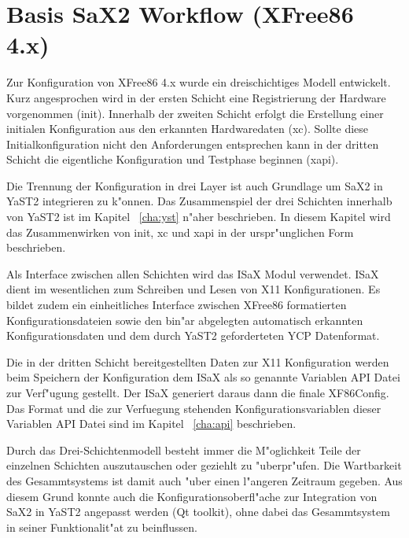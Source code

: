 \chapter{Basis SaX2 Workflow (XFree86 4.x)}
\label{cha:dsp}
\minitoc
Zur Konfiguration von XFree86 4.x wurde ein dreischichtiges Modell
entwickelt. Kurz angesprochen wird in der ersten Schicht eine
Registrierung der Hardware vorgenommen (init). Innerhalb der 
zweiten Schicht erfolgt die Erstellung einer initialen Konfiguration
aus den erkannten Hardwaredaten (xc). Sollte diese Initialkonfiguration
nicht den Anforderungen entsprechen kann in der dritten Schicht
die eigentliche Konfiguration und Testphase beginnen (xapi).

Die Trennung der Konfiguration in drei Layer ist auch Grundlage
um SaX2 in YaST2 integrieren zu k"onnen. Das Zusammenspiel
der drei Schichten innerhalb von YaST2 ist im Kapitel ~\ref{cha:yst}
n"aher beschrieben. In diesem Kapitel wird das Zusammenwirken von
init, xc und xapi in der urspr"unglichen Form beschrieben.

Als Interface zwischen allen Schichten wird das ISaX Modul
verwendet. ISaX dient im wesentlichen zum Schreiben und Lesen
von X11 Konfigurationen. Es bildet zudem ein einheitliches Interface
zwischen XFree86 formatierten Konfigurationsdateien sowie den bin"ar
abgelegten automatisch erkannten Konfigurationsdaten und dem
durch YaST2 geforderteten YCP Datenformat.

Die in der dritten Schicht bereitgestellten Daten zur X11 Konfiguration
werden beim Speichern der Konfiguration dem ISaX als so genannte 
Variablen API Datei zur Verf"ugung gestellt. Der ISaX generiert daraus
dann die finale XF86Config. Das Format und die zur Verfuegung stehenden
Konfigurationsvariablen dieser Variablen API Datei sind im Kapitel 
~\ref{cha:api} beschrieben.

Durch das Drei-Schichtenmodell besteht immer die M"oglichkeit Teile 
der einzelnen Schichten auszutauschen oder geziehlt zu "uberpr"ufen.
Die Wartbarkeit des Gesammtsystems ist damit auch "uber einen l"angeren
Zeitraum gegeben. Aus diesem Grund konnte auch die 
Konfigurationsoberfl"ache zur Integration von SaX2 in YaST2 angepasst 
werden (Qt toolkit), ohne dabei das Gesammtsystem in seiner 
Funktionalit"at zu beinflussen.

